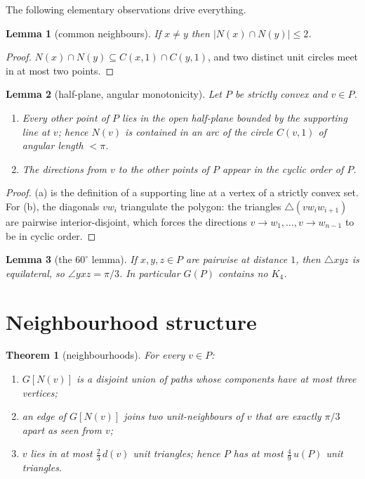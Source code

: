 \documentclass[11pt]{article}
\newtheorem{theorem}{Theorem}
\newtheorem{lemma}{Lemma}
\theoremstyle{definition}
\theoremstyle{remark}
\begin{document}
The following elementary observations drive everything.

\begin{lemma}[common neighbours]\label{lem:two}
If $x\ne y$ then $|N(x)\cap N(y)|\le 2$.
\end{lemma}
\begin{proof}
$N(x)\cap N(y)\subseteq C(x,1)\cap C(y,1)$, and two distinct unit circles meet in at
most two points.
\end{proof}

\begin{lemma}[half-plane, angular monotonicity]\label{lem:half}
Let $P$ be strictly convex and $v\in P$.
\begin{enumerate}[label=\textup{(\alph*)}]
\item Every other point of $P$ lies in the open half-plane bounded by the supporting
line at $v$; hence $N(v)$ is contained in an arc of the circle $C(v,1)$ of angular
length $<\pi$.
\item The directions from $v$ to the other points of $P$ appear in the cyclic order of
$P$.
\end{enumerate}
\end{lemma}
\begin{proof}
(a) is the definition of a supporting line at a vertex of a strictly convex set.
For (b), the diagonals $vw_i$ triangulate the polygon: the triangles
$\triangle(vw_iw_{i+1})$ are pairwise interior-disjoint, which forces the directions
$v\to w_1,\dots,v\to w_{n-1}$ to be in cyclic order.
\end{proof}

\begin{lemma}[the $60^\circ$ lemma]\label{lem:60}
If $x,y,z\in P$ are pairwise at distance $1$, then $\triangle xyz$ is equilateral, so
$\angle yxz=\pi/3$.  In particular $G(P)$ contains no $K_4$.
\end{lemma}

\section{Neighbourhood structure}

\begin{theorem}[neighbourhoods]\label{thm:nbhd}
For every $v\in P$:
\begin{enumerate}[label=\textup{(\alph*)}]
\item $G[N(v)]$ is a disjoint union of paths whose components have at most three
vertices;
\item an edge of $G[N(v)]$ joins two unit-neighbours of $v$ that are exactly $\pi/3$
apart as seen from $v$;
\item $v$ lies in at most $\tfrac23\,d(v)$ unit triangles; hence $P$ has at most
$\tfrac49\,u(P)$ unit triangles.
\end{enumerate}
\end{theorem}
\end{document}
